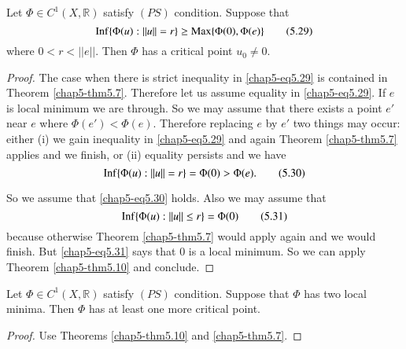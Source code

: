 \begin{proposition}\label{chap5-prop5.11}
Let $\Phi\in C^{1}(X,\mathbb{R})$ satisfy $(PS)$ condition. Suppose
that
\begin{equation*}
\operatorname{Inf}\{\Phi(u):||u||=r\}\geq
\operatorname{Max}\{\Phi(0),\Phi(e)\}\tag{5.29}\label{chap5-eq5.29} 
\end{equation*}
where $0<r<||e||$. Then $\Phi$ has a critical point $u_{0}\neq 0$.
\end{proposition}

\begin{proof}
The case when there is strict inequality in \eqref{chap5-eq5.29} is
contained in Theorem \ref{chap5-thm5.7}. Therefore let us assume
equality in \eqref{chap5-eq5.29}. If $e$ is local minimum we are
through. So we may assume that there exists a point $e'$ near $e$
where $\Phi(e')<\Phi(e)$. Therefore replacing $e$ by $e'$ two things
may occur: either (i) we gain inequality in \eqref{chap5-eq5.29} and
again Theorem \ref{chap5-thm5.7} applies and we finish, or (ii)
equality persists and we have
\begin{equation*}
\operatorname{Inf}\{\Phi(u):||u||=r\}=\Phi(0)>\Phi(e).\tag{5.30}\label{chap5-eq5.30}
\end{equation*}

So we assume that \eqref{chap5-eq5.30} holds. Also we may assume that
\begin{equation*}
\operatorname{Inf}\{\Phi(u):||u||\leq r\}=\Phi(0)\tag{5.31}\label{chap5-eq5.31}
\end{equation*}
because otherwise Theorem \ref{chap5-thm5.7} would apply again and we
would finish. But \eqref{chap5-eq5.31} says that $0$ is a local
minimum. So we can apply Theorem \ref{chap5-thm5.10} and conclude.
\end{proof}

\begin{corollary}\label{chap5-coro5.12}
Let $\Phi\in C^{1}(X,\mathbb{R})$ satisfy $(PS)$ condition. Suppose
that $\Phi$ has two local minima. Then $\Phi$ has at least one more
critical point.
\end{corollary}

\begin{proof}
Use Theorems \ref{chap5-thm5.10} and \ref{chap5-thm5.7}.
\end{proof}








